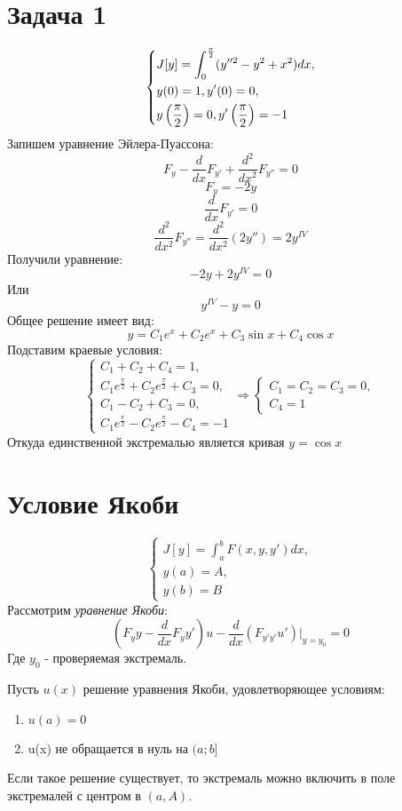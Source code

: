 \documentclass[11pt]{article}
\begin{document}
\section{Задача 1}
\label{sec:orga10b663}
\begin{equation*}
\begin{dcases}
J[y] = \int_0^{\frac{\pi}2}(y''^2 - y^2 + x^2)dx, \\
y(0) = 1, y'(0) = 0, \\
y\left(\frac{\pi}2\right) = 0, y'\left(\frac{\pi}2\right) = -1
\end{dcases}
\end{equation*}
Запишем уравнение Эйлера-Пуассона:
$$F_y - \frac{d}{dx}F_{y'} + \frac{d^2}{dx^2}F_{y''} = 0$$
$$F_y = -2y$$
$$\frac{d}{dx}F_{y'} = 0$$
$$\frac{d^2}{dx^2}F_{y''} = \frac{d^2}{dx^2}(2y'') = 2y^{IV}$$
Получили уравнение:
$$-2y + 2y^{IV} = 0$$
Или $$y^{IV} - y = 0$$
Общее решение имеет вид:
$$y = C_1e^x + C_2e^x + C_3\sin x + C_4\cos x$$
Подставим краевые условия:
\begin{equation*}
\begin{cases}
C_1 + C_2 + C_4 = 1, \\
C_1e^{\frac{\pi}2} + C_2e^{\frac{\pi}2} + C_3 = 0, \\
C_1 - C_2 + C_3 = 0, \\
C_1e^{\frac{\pi}2} - C_2e^{\frac{\pi}2} - C_4 = -1
\end{cases}
\Rightarrow
\begin{cases}
C_1 = C_2 = C_3 = 0, \\
C_4 = 1
\end{cases}
\end{equation*}
Откуда единственной экстремалью является кривая \(y = \cos x\)
\section{Условие Якоби}
\label{sec:orgbe48d58}
\begin{equation*}
\begin{cases}
J[y] = \int_a^bF(x, y, y')dx, \\
y(a) = A, \\
y(b) = B
\end{cases}
\end{equation*}
Рассмотрим \textit{уравнение Якоби}:
$$(F_yy - \frac{d}{dx}F_yy')u - \frac{d}{dx}(F_{y'y'}u')|_{y = y_0} = 0$$
Где \(y_0\) - проверяемая экстремаль.


Пусть \(u(x)\) решение уравнения Якоби, удовлетворяющее условиям:
\begin{enumerate}
\item \(u(a) = 0\)
\item u(x) не обращается в нуль на \((a; b]\)
\end{enumerate}
Если такое решение существует, то экстремаль можно включить в поле экстремалей с центром в \((a, A)\).
\end{document}
